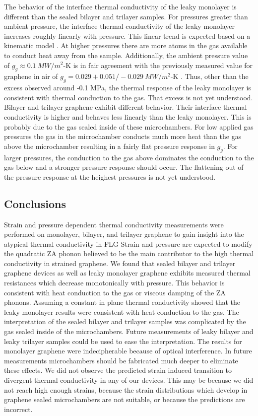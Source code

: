 The behavior of the interface thermal conductivity of the leaky monolayer is different than the sealed bilayer and trilayer samples.
For pressures greater than ambient pressure, the interface thermal conductivity of the leaky monolayer increases roughly linearly with pressure.
This linear trend is expected based on a kinematic model \cite{Chen2011a}.
At higher pressures there are more atoms in the gas available to conduct heat away from the sample.
Additionally, the ambient pressure value of $g_g \approx 0.1 \ MW/m^2$-K is in fair agreement with the previously measured value for graphene in air of $g_g = 0.029+0.051/-0.029 \ MW/m^2$-K \cite{Chen2011a}.
Thus, other than the excess observed around -0.1 MPa, the thermal response of the leaky monolayer is consistent with thermal conduction to the gas.
That excess is not yet understood.
Bilayer and trilayer graphene exhibit different behavior.
Their interface thermal conductivity is higher and behaves less linearly than the leaky monolayer.
This is probably due to the gas sealed inside of these microchambers.
For low applied gas pressures the gas in the microchamber conducts much more heat than the gas above the microchamber resulting in a fairly flat pressure response in $g_g$.
For larger pressures, the conduction to the gas above dominates the conduction to the gas below and a stronger pressure response should occur.
The flattening out of the pressure response at the heighest pressures is not yet understood.

\subsection{Conclusions}
Strain and pressure dependent thermal conductivity measurements were performed on monolayer, bilayer, and trilayer graphene to gain insight into the atypical thermal conductivity in FLG
Strain and pressure are expected to modify the quadratic ZA phonon believed to be the main contributor to the high thermal conductivity in strained graphene.
We found that sealed bilayer and trilayer graphene devices as well as leaky monolayer graphene exhibits measured thermal resistances which decrease monotonically with pressure.
This behavior is consistent with heat conduction to the gas or viscous damping of the ZA phonons.
Assuming a constant in plane thermal conductivity showed that the leaky monolayer results were consistent with heat conduction to the gas.
The interpretation of the sealed bilayer and trilayer samples was complicated by the gas sealed inside of the microchambers.
Future measurements of leaky bilayer and leaky trilayer samples could be used to ease the interpretation.
The results for monolayer graphene were indecipherable because of optical interference.
In future measurements microchambers should be fabricated much deeper to eliminate these effects.
We did not observe the predicted strain induced transition to divergent thermal conductivity \cite{Bonini2012,Pereira2013} in any of our devices.
This may be because we did not reach high enough strains, because the strain distributions which develop in graphene sealed microchambers are not suitable, or because the predictions are incorrect.